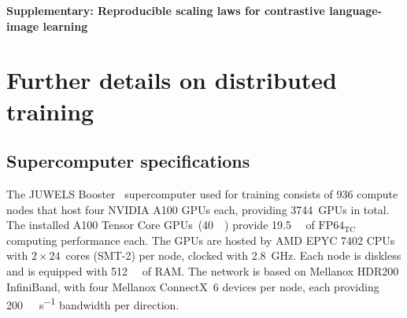 

\begin{appendix}

\begin{center}
{\Large\bf Supplementary: Reproducible scaling laws for contrastive language-image learning}
\end{center}

\section{Further details on distributed training}
\label{appendix:distributed_training}


\subsection{Supercomputer specifications}
\label{appendix:booster}

The JUWELS Booster~\citep{JUWELSBooster2020} supercomputer used for training  consists of \num{936} compute nodes that host four NVIDIA A100 GPUs each, providing \num{3744}~GPUs in total. The installed A100 Tensor Core GPUs~(\SI{40}{\giga\byte}) provide \SI{19.5}{\tera\floppersec} of $\text{FP64}_\text{TC}$ computing performance each. The GPUs are hosted by AMD EPYC 7402 CPUs with $2\times 24$~cores (SMT-2) per node, clocked with \SI{2.8}{\giga\Hz}. Each node is diskless and is equipped with \SI{512}{\giga\byte} of RAM. The network is based on Mellanox HDR200 InfiniBand, with four Mellanox ConnectX~6 devices per node, each providing \SI{200}{\giga\bit\per\second} bandwidth per direction.




\end{appendix}
